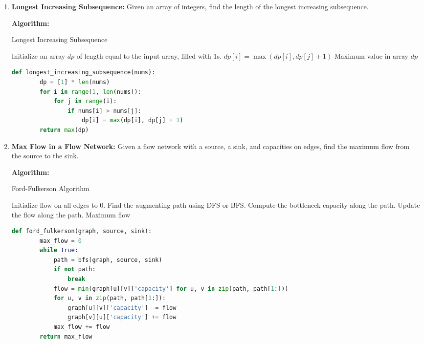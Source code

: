 \documentclass[12pt]{book} %
\begin{document}
\begin{enumerate}
    \item \textbf{Longest Increasing Subsequence:} Given an array of integers, find the length of the longest increasing subsequence.
    
    \textbf{Algorithm:}
    \begin{algorithm}
        \caption{Longest Increasing Subsequence}
        \begin{algorithmic}[1]
            \State Initialize an array $dp$ of length equal to the input array, filled with 1s.
                        \State $dp[i] = \max(dp[i], dp[j] + 1)$
                    \EndIf
                \EndFor
            \EndFor
            \Return Maximum value in array $dp$
        \end{algorithmic}
    \end{algorithm}
    
    \FloatBarrier
    \begin{lstlisting}[language=Python]
    def longest_increasing_subsequence(nums):
        dp = [1] * len(nums)
        for i in range(1, len(nums)):
            for j in range(i):
                if nums[i] > nums[j]:
                    dp[i] = max(dp[i], dp[j] + 1)
        return max(dp)
    \end{lstlisting}
    \FloatBarrier
    
    \item \textbf{Max Flow in a Flow Network:} Given a flow network with a source, a sink, and capacities on edges, find the maximum flow from the source to the sink.
    
    \textbf{Algorithm:}
    \begin{algorithm}
        \caption{Ford-Fulkerson Algorithm}
        \begin{algorithmic}[1]
            \State Initialize flow on all edges to 0.
                \State Find the augmenting path using DFS or BFS.
                \State Compute the bottleneck capacity along the path.
                \State Update the flow along the path.
            \EndWhile
            \Return Maximum flow
        \end{algorithmic}
    \end{algorithm}
    
    \FloatBarrier
    \begin{lstlisting}[language=Python]
    def ford_fulkerson(graph, source, sink):
        max_flow = 0
        while True:
            path = bfs(graph, source, sink)
            if not path:
                break
            flow = min(graph[u][v]['capacity'] for u, v in zip(path, path[1:]))
            for u, v in zip(path, path[1:]):
                graph[u][v]['capacity'] -= flow
                graph[v][u]['capacity'] += flow
            max_flow += flow
        return max_flow
    \end{lstlisting}
    \FloatBarrier
\end{enumerate}
\end{document}
